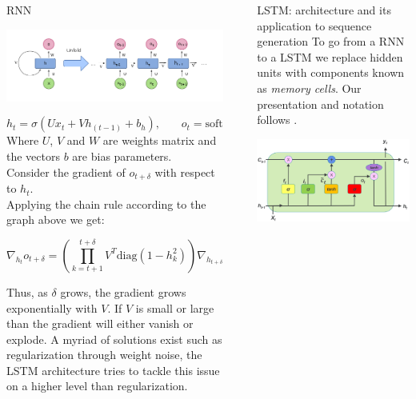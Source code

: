 \documentclass[final]{beamer}
\newlength{\sepwidth}
\newlength{\colwidth}
\newcommand{\separatorcolumn}{\begin{column}{\sepwidth}\end{column}}
\begin{document}
\begin{frame}[t]
\begin{columns}[t]
\begin{column}{\colwidth}
\begin{block}{RNN} 
\begin{center}
    \includegraphics[width = 0.9\linewidth]{RNN.png}
\end{center}
\begin{equation*}
    h_t = \sigma(U x_t + V h_{(t-1)} + b_h)\text{,}
    \qquad o_t = \text{softmax}(W h_t + b_o)
\end{equation*}
\small{Where $ U$, $V$ and $W$ are weights matrix and the vectors $b$ are bias
parameters.}\\

\normalsize
Consider the gradient of $o_{t + \delta}$ with respect to $h_t$.\\
Applying the chain rule according to the graph above we get:

\begin{equation*}
  \nabla_{h_t} o_{t + \delta} = \left( \prod_{k = t+1}^{t+\delta} V^T
  \text{diag}(1 - h^2_k) \right)\nabla_{h_{t + \delta}}o_{t + \delta}.
\end{equation*}

Thus, as $\delta$ grows, the gradient grows exponentially with $V$. If $V$ is
small or large than the gradient will either vanish or explode. A myriad
of solutions exist such as regularization through weight noise, the LSTM
architecture tries to tackle this issue on a higher level than regularization.
\end{block}
\end{column}
\separatorcolumn

\begin{column}{\colwidth}

\begin{block}{LSTM: architecture and its application to sequence generation}
To go from a RNN to a LSTM we replace hidden units with components known as
\textit{memory cells}. Our presentation and notation follows \cite{revieww}.
\begin{center}
    \includegraphics[width = 0.7\linewidth]{lstm.png}
\end{center}


\end{block}
\end{column}
\end{columns}
\end{frame}
\end{document}
